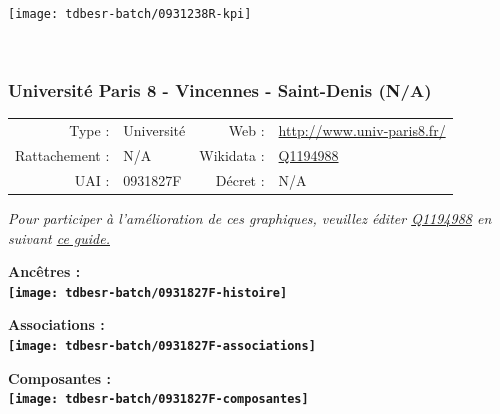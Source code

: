 \documentclass[12pt,french,]{article}
\begin{document}
\begin{center}\texttt{[image: tdbesr-batch/0931238R-kpi]} \end{center}\checkoddpage

\ifoddpage \fi ~\newpage  

\hypertarget{universituxe9-paris-8---vincennes---saint-denis-na}{%
\subsubsection{Université Paris 8 - Vincennes - Saint-Denis
(N/A)}\label{universituxe9-paris-8---vincennes---saint-denis-na}}

\begin{tabular*}{\textwidth}{rp{5cm}rl}  
\hline  
Type : & Université & Web : &\href{http://www.univ-paris8.fr/}{http://www.univ-paris8.fr/} \\  
Rattachement : & N/A & Wikidata : & \href{https://www.wikidata.org/entity/Q1194988}{Q1194988} \\  
UAI : & 0931827F & Décret : & N/A \\  
\hline  
\end{tabular*}

\textit{\scriptsize Pour participer à l'amélioration de ces graphiques, veuillez éditer  \href{https://www.wikidata.org/entity/Q1194988}{Q1194988}  en suivant \href{https://github.com/cpesr/wikidataESR/blob/master/Rmd/wikidataESR.md}{ce guide.}}

\vspace{1cm}  
\begin{minipage}[b]{0.50\textwidth}\begin{center} \bf Ancêtres : \\  
\texttt{[image: tdbesr-batch/0931827F-histoire]} \end{center}\end{minipage}\begin{minipage}[b]{0.50\textwidth}\begin{center} \bf Associations : \\  
\texttt{[image: tdbesr-batch/0931827F-associations]} \end{center}\end{minipage}

\hrulefill

\begin{center} \bf Composantes : \\  
\texttt{[image: tdbesr-batch/0931827F-composantes]} \end{center}
\end{document}
